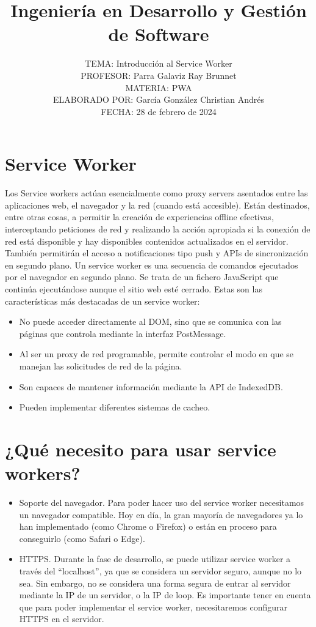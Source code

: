 \documentclass{article}
\title{Ingeniería en Desarrollo y Gestión de Software}
\author{TEMA: Introducción al Service Worker \\
        PROFESOR: Parra Galaviz Ray Brunnet \\
        MATERIA: PWA \\
        ELABORADO POR: García González Christian Andrés \\
        FECHA: 28 de febrero de 2024}
\date{}
\begin{document}
\maketitle

\section{Service Worker}
Los Service workers actúan esencialmente como proxy servers asentados entre las aplicaciones web, el navegador y la red (cuando está accesible). Están destinados, entre otras cosas, a permitir la creación de experiencias offline efectivas, interceptando peticiones de red y realizando la acción apropiada si la conexión de red está disponible y hay disponibles contenidos actualizados en el servidor. También permitirán el acceso a notificaciones tipo push y APIs de sincronización en segundo plano. Un service worker es una secuencia de comandos ejecutados por el navegador en segundo plano. Se trata de un fichero JavaScript que continúa ejecutándose aunque el sitio web esté cerrado. Estas son las características más destacadas de un service worker:
\begin{itemize}
    \item No puede acceder directamente al DOM, sino que se comunica con las páginas que controla mediante la interfaz PostMessage.
    \item Al ser un proxy de red programable, permite controlar el modo en que se manejan las solicitudes de red de la página.
    \item Son capaces de mantener información mediante la API de IndexedDB.
    \item Pueden implementar diferentes sistemas de cacheo.
\end{itemize}

\section{¿Qué necesito para usar service workers?}
\begin{itemize}
    \item Soporte del navegador. Para poder hacer uso del service worker necesitamos un navegador compatible. Hoy en día, la gran mayoría de navegadores ya lo han implementado (como Chrome o Firefox) o están en proceso para conseguirlo (como Safari o Edge).
    \item HTTPS. Durante la fase de desarrollo, se puede utilizar service worker a través del “localhost”, ya que se considera un servidor seguro, aunque no lo sea. Sin embargo, no se considera una forma segura de entrar al servidor mediante la IP de un servidor, o la IP de loop. Es importante tener en cuenta que para poder implementar el service worker, necesitaremos configurar HTTPS en el servidor.
\end{itemize}
\end{document}
